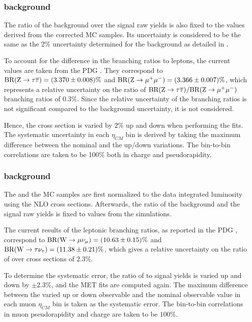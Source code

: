 \subsubsection{\texorpdfstring{\DYToTauTau}\ background}

The ratio of the \DYToTauTau background over the signal raw yields is also fixed to the values derived from the corrected MC samples. Its uncertainty is considered to be the same as the 2$\%$ uncertainty determined for the \DYToMuMu background as detailed in .

To account for the difference in the \Z branching ratios to leptons, the current values are taken from the PDG \cite{PDG}. They correspond to $\textrm{BR}(\text{Z}\to\tau\overline{\tau}) = (3.370 \pm 0.008)\%$ and $\textrm{BR}(\text{Z}\to\mu^+\mu^-) = (3.366 \pm 0.007)\%$, which represents a relative uncertainty on the ratio of $\textrm{BR}(\text{Z}\to\tau\overline{\tau})/\textrm{BR}(\text{Z}\to\mu^+\mu^-)$ branching ratios of $0.3\%$. Since the relative uncertainty of the \Z branching ratios is not significant compared to the \DYToMuMu background uncertainty, it is not considered.

Hence, the \DYToTauTau cross section is varied by $2\%$ up and down when performing the fits. The systematic uncertainty in each $\eta_{CM}$ bin is derived by taking the maximum difference between the nominal and the up/down variations. The bin-to-bin correlations are taken to be 100\% both in charge and pseudorapidity.

\subsubsection{\texorpdfstring{\WToTauNu}\ background}

The \WToTauNu and the \WToMuNu MC samples are first normalized to the data integrated luminosity using the \POWHEG NLO cross sections. Afterwards, the ratio of the \WToTauNu background and the signal raw yields is fixed to values from the simulations.

The current results of the \W leptonic branching ratios, as reported in the PDG \cite{PDG}, correspond to $\textrm{BR}(\text{W}\to\mu\nu_\mu) = (10.63 \pm 0.15)\%$ and $\textrm{BR}(\text{W}\to\tau\nu_\tau) = (11.38 \pm 0.21)\%$, which gives a relative uncertainty on the ratio of \WToTauNu over \WToMuNu cross sections of $2.3\%$.

To determine the systematic error, the ratio of \WToTauNu to signal yields is varied up and down by $\pm$2.3\%, and the MET fits are computed again. The maximum difference between the varied up or down observable and the nominal observable value in each muon $\eta_{CM}$ bin is taken as the systematic error. The bin-to-bin correlations in muon pseudorapidity and charge are taken to be $100\%$.

